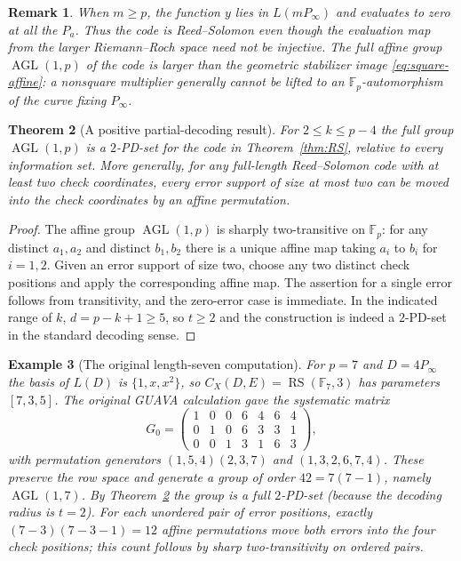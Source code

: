 \documentclass[12pt]{article}
\newtheorem{theorem}{Theorem}[section]
\newtheorem{example}[theorem]{Example}
\newtheorem{remark}[theorem]{Remark}
\numberwithin{equation}{section}
\newcommand{\F}{\mathbb{F}}
\newcommand{\RS}{\operatorname{RS}}
\newcommand{\AGL}{\operatorname{AGL}}
\begin{document}
\begin{remark}\label{rem:RSkernel}
When $m\geq p$, the function $y$ lies in $L(mP_\infty)$
and evaluates to zero at all the $P_a$.  Thus the code is
Reed--Solomon even though the evaluation map from the
larger Riemann--Roch space need not be injective.
The full affine group $\AGL(1,p)$ of the code is larger
than the geometric stabilizer image \eqref{eq:square-affine}:
a nonsquare multiplier generally cannot be lifted to an
$\F_p$-automorphism of the curve fixing $P_\infty$.
\end{remark}

\begin{theorem}[A positive partial-decoding result]
\label{thm:two-pd}
For $2\leq k\leq p-4$ the full group
$\AGL(1,p)$ is a $2$-PD-set for the code in
Theorem~\ref{thm:RS}, relative to \emph{every} information
set.  More generally, for any full-length Reed--Solomon
code with at least two check coordinates, every error
support of size at most two can be moved into the check
coordinates by an affine permutation.
\end{theorem}
\begin{proof}
The affine group $\AGL(1,p)$ is sharply two-transitive
on $\F_p$: for any distinct $a_1,a_2$ and distinct
$b_1,b_2$ there is a unique affine map taking
$a_i$ to $b_i$ for $i=1,2$.  Given an error support
of size two, choose any two distinct check positions and
apply the corresponding affine map.  The assertion for a
single error follows from transitivity, and the zero-error
case is immediate.  In the indicated range of $k$,
$d=p-k+1\geq5$, so $t\geq2$ and the construction is
indeed a $2$-PD-set in the standard decoding sense.
\end{proof}

\begin{example}[The original length-seven computation]
\label{ex:7-3-5}
For $p=7$ and $D=4P_\infty$ the basis of
$L(D)$ is $\{1,x,x^2\}$, so
$C_X(D,E)=\RS(\F_7,3)$ has parameters $[7,3,5]$.
The original GUAVA calculation gave the systematic matrix
\[
G_0=\begin{pmatrix}
1&0&0&6&4&6&4\\
0&1&0&6&3&3&1\\
0&0&1&3&1&6&3
\end{pmatrix},
\]
with permutation generators
$ (1,5,4)(2,3,7)$ and $(1,3,2,6,7,4)$.
These preserve the row space and generate a group of
order $42=7(7-1)$, namely $\AGL(1,7)$.
By Theorem~\ref{thm:two-pd} the group is a full
$2$-PD-set (because the decoding radius is $t=2$).
For each unordered pair of error positions, exactly
$(7-3)(7-3-1)=12$ affine permutations move both errors
into the four check positions; this count follows by
sharp two-transitivity on ordered pairs.
\end{example}
\end{document}
